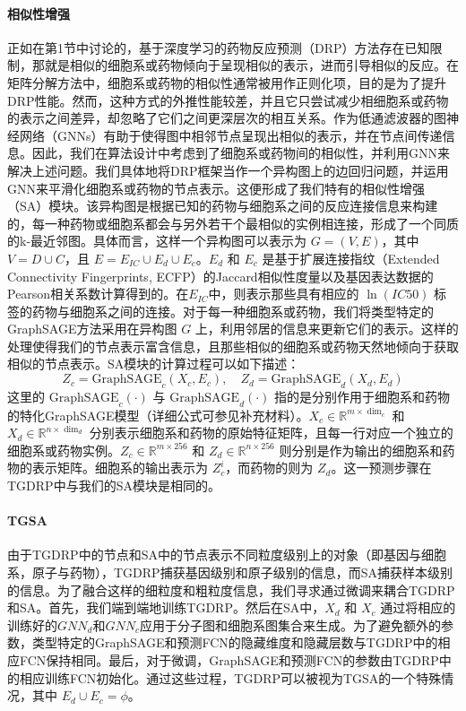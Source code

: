 \paragraph{相似性增强}
正如在第1节中讨论的，基于深度学习的药物反应预测（DRP）方法存在已知限制，那就是相似的细胞系或药物倾向于呈现相似的表示，进而引导相似的反应。在矩阵分解方法中，细胞系或药物的相似性通常被用作正则化项，目的是为了提升DRP性能\cite{Guan2019, Wang2017}。然而，这种方式的外推性能较差，并且它只尝试减少相细胞系或药物的表示之间差异，却忽略了它们之间更深层次的相互关系。作为低通滤波器的图神经网络（GNNs）有助于使得图中相邻节点呈现出相似的表示\cite{Wu2019}，并在节点间传递信息\cite{Gilmer2017}。因此，我们在算法设计中考虑到了细胞系或药物间的相似性，并利用GNN来解决上述问题。我们具体地将DRP框架当作一个异构图上的边回归问题，并运用GNN来平滑化细胞系或药物的节点表示。这便形成了我们特有的相似性增强（SA）模块。该异构图是根据已知的药物与细胞系之间的反应连接信息来构建的，每一种药物或细胞系都会与另外若干个最相似的实例相连接，形成了一个同质的k-最近邻图。具体而言，这样一个异构图可以表示为 \( G = (V, E) \)，其中 \( V = D \cup C \)，且 \( E = E_{IC} \cup E_d \cup E_c \)。\( E_d \) 和 \( E_c \) 是基于扩展连接指纹（Extended Connectivity Fingerprints, ECFP）的Jaccard相似性度量以及基因表达数据的Pearson相关系数计算得到的\cite{Rogers2010}。在\( E_{IC} \)中，则表示那些具有相应的 \( \ln(IC50) \) 标签的药物与细胞系之间的连接。对于每一种细胞系或药物，我们将类型特定的GraphSAGE方法采用在异构图 \( G \) 上，利用邻居的信息来更新它们的表示。这样的处理使得我们的节点表示富含信息，且那些相似的细胞系或药物天然地倾向于获取相似的节点表示。SA模块的计算过程可以如下描述：
\[
Z_c = \text{GraphSAGE}_c(X_c, E_c), \quad Z_d = \text{GraphSAGE}_d(X_d, E_d)
\]
这里的 \( \text{GraphSAGE}_c(\cdot) \) 与 \( \text{GraphSAGE}_d(\cdot) \) 指的是分别作用于细胞系和药物的特化GraphSAGE模型（详细公式可参见补充材料）。\( X_c \in \mathbb{R}^{m \times \dim_c} \) 和 \( X_d \in \mathbb{R}^{n \times \dim_d} \) 分别表示细胞系和药物的原始特征矩阵，且每一行对应一个独立的细胞系或药物实例。\( Z_c \in \mathbb{R}^{m \times 256} \) 和 \( Z_d \in \mathbb{R}^{n \times 256} \) 则分别是作为输出的细胞系和药物的表示矩阵。细胞系的输出表示为 \( Z_c^i \)，而药物的则为 \( Z_d \)。这一预测步骤在TGDRP中与我们的SA模块是相同的。

\paragraph{TGSA}
由于TGDRP中的节点和SA中的节点表示不同粒度级别上的对象（即基因与细胞系，原子与药物），TGDRP捕获基因级别和原子级别的信息，而SA捕获样本级别的信息。为了融合这样的细粒度和粗粒度信息，我们寻求通过微调来耦合TGDRP和SA。首先，我们端到端地训练TGDRP。然后在SA中，\( X_d \) 和 \( X_c \) 通过将相应的训练好的\( GNN_d \)和\( GNN_c \)应用于分子图和细胞系图集合来生成。为了避免额外的参数，类型特定的GraphSAGE和预测FCN的隐藏维度和隐藏层数与TGDRP中的相应FCN保持相同。最后，对于微调，GraphSAGE和预测FCN的参数由TGDRP中的相应训练FCN初始化。通过这些过程，TGDRP可以被视为TGSA的一个特殊情况，其中 \( E_d \cup E_c = \phi \)。

